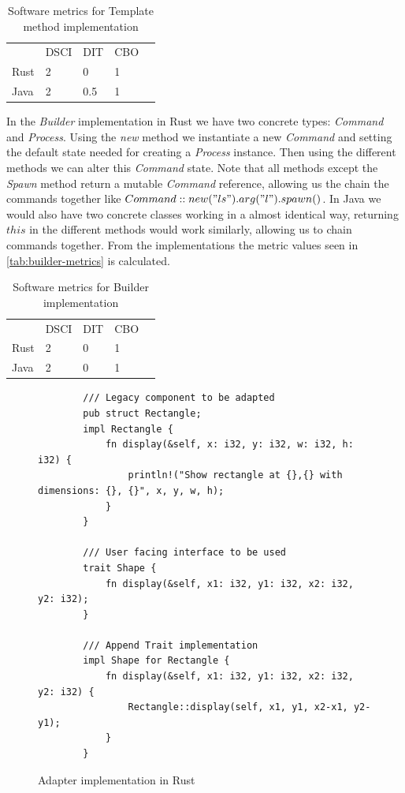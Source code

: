 \documentclass[conference]{IEEEtran}
\begin{document}
\begin{table}[hbtp]
    \centering
    \caption{Software metrics for Template method implementation}
    \label{tab:template-metrics}
    \begin{tabular}{lllll}
        & DSCI   & DIT  & CBO   &  \\
        Rust & 2 & 0    & 1     &  \\
        Java & 2 & 0.5  & 1     &  \\
    \end{tabular}
\end{table}

In the \emph{Builder} implementation in Rust we have two concrete types: \emph{Command} and \emph{Process}.
Using the \emph{new} method we instantiate a new \emph{Command} and setting the default state needed for creating a \emph{Process} instance.
Then using the different methods we can alter this \emph{Command} state.
Note that all methods except the \emph{Spawn} method return a mutable \emph{Command} reference, allowing us the chain the commands together like $Command::new("ls").arg("l").spawn()$.
In Java we would also have two concrete classes working in a almost identical way, returning $this$ in the different methods would work similarly, allowing us to chain commands together.
From the implementations the metric values seen in \autoref{tab:builder-metrics} is calculated.

\begin{table}[hbtp]
    \centering
    \caption{Software metrics for Builder implementation}
    \label{tab:builder-metrics}
    \begin{tabular}{lllll}
        & DSCI   & DIT  & CBO   &  \\
        Rust & 2 & 0    & 1     &  \\
        Java & 2 & 0    & 1     &  \\
    \end{tabular}
\end{table}

\begin{figure}[btp]
    \begin{verbatim}
        /// Legacy component to be adapted
        pub struct Rectangle;
        impl Rectangle {
            fn display(&self, x: i32, y: i32, w: i32, h: i32) {
                println!("Show rectangle at {},{} with dimensions: {}, {}", x, y, w, h);
            }
        }

        /// User facing interface to be used
        trait Shape {
            fn display(&self, x1: i32, y1: i32, x2: i32, y2: i32);
        }

        /// Append Trait implementation
        impl Shape for Rectangle {
            fn display(&self, x1: i32, y1: i32, x2: i32, y2: i32) {
                Rectangle::display(self, x1, y1, x2-x1, y2-y1);
            }
        }
    \end{verbatim}
    \caption{Adapter implementation in Rust}
    \label{fig:adapter-impl}
\end{figure}
\end{document}
